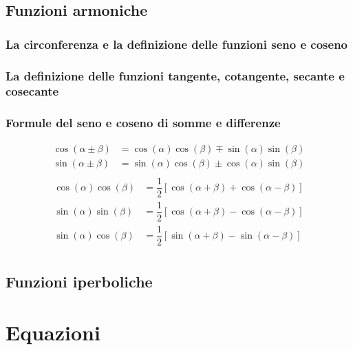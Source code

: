 \section{Funzioni armoniche}
\subsection{La circonferenza e la definizione delle funzioni seno e coseno}

\subsection{La definizione delle funzioni tangente, cotangente, secante e cosecante}

\subsection{Formule del seno e coseno di somme e differenze}
\begin{equation}
\begin{aligned}
    \cos(\alpha \pm \beta) & = \cos(\alpha) \cos(\beta) \mp \sin(\alpha) \sin(\beta) \\
    \sin(\alpha \pm \beta) & = \sin(\alpha) \cos(\beta) \pm \cos(\alpha) \sin(\beta) \\
\end{aligned}
\end{equation}
\begin{equation}
\begin{aligned}
    \cos(\alpha) \cos(\beta) & = \dfrac{1}{2} \left[ \cos(\alpha + \beta) + \cos(\alpha-\beta) \right] \\
    \sin(\alpha) \sin(\beta) & = \dfrac{1}{2} \left[ \cos(\alpha + \beta) - \cos(\alpha-\beta) \right] \\
    \sin(\alpha) \cos(\beta) & = \dfrac{1}{2} \left[ \sin(\alpha + \beta) - \sin(\alpha-\beta) \right] \\
\end{aligned}
\end{equation}

\section{Funzioni iperboliche}


\chapter{Equazioni}
